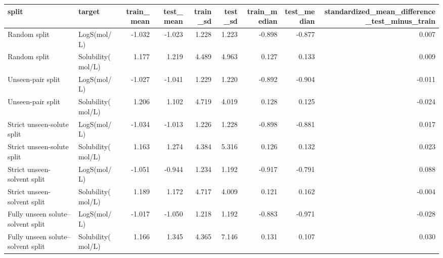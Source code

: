 \begin{tabular}{llrrrrrrr}
\toprule
split & target & train_mean & test_mean & train_sd & test_sd & train_median & test_median & standardized_mean_difference_test_minus_train \\
\midrule
Random split & LogS(mol/L) & -1.032 & -1.023 & 1.228 & 1.223 & -0.898 & -0.877 & 0.007 \\
Random split & Solubility(mol/L) & 1.177 & 1.219 & 4.489 & 4.963 & 0.127 & 0.133 & 0.009 \\
Unseen-pair split & LogS(mol/L) & -1.027 & -1.041 & 1.229 & 1.220 & -0.892 & -0.904 & -0.011 \\
Unseen-pair split & Solubility(mol/L) & 1.206 & 1.102 & 4.719 & 4.019 & 0.128 & 0.125 & -0.024 \\
Strict unseen-solute split & LogS(mol/L) & -1.034 & -1.013 & 1.226 & 1.228 & -0.898 & -0.881 & 0.017 \\
Strict unseen-solute split & Solubility(mol/L) & 1.163 & 1.274 & 4.384 & 5.316 & 0.126 & 0.132 & 0.023 \\
Strict unseen-solvent split & LogS(mol/L) & -1.051 & -0.944 & 1.234 & 1.192 & -0.917 & -0.791 & 0.088 \\
Strict unseen-solvent split & Solubility(mol/L) & 1.189 & 1.172 & 4.717 & 4.009 & 0.121 & 0.162 & -0.004 \\
Fully unseen solute--solvent split & LogS(mol/L) & -1.017 & -1.050 & 1.218 & 1.192 & -0.883 & -0.971 & -0.028 \\
Fully unseen solute--solvent split & Solubility(mol/L) & 1.166 & 1.345 & 4.365 & 7.146 & 0.131 & 0.107 & 0.030 \\
\bottomrule
\end{tabular}

